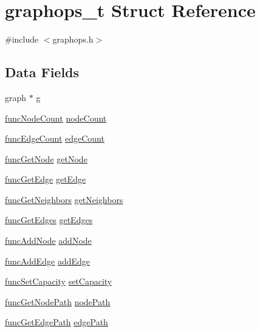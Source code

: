 \hypertarget{structgraphops__t}{}\section{graphops\+\_\+t Struct Reference}
\label{structgraphops__t}


{\ttfamily \#include $<$graphops.\+h$>$}

\subsection*{Data Fields}
\begin{DoxyCompactItemize}
\item 
graph $\ast$ \hyperlink{structgraphops__t_ab8a78cf4f0bdfe6a65aa217a716ca537}{g}
\item 
\hyperlink{graphops_8h_a5f1ba03cba8efec39224db7b6afc8374}{func\+Node\+Count} \hyperlink{structgraphops__t_a07801b43de87d48f426d7abf7959e738}{node\+Count}
\item 
\hyperlink{graphops_8h_a9c7f99c0f38ebae08cb49e70ffe91fa1}{func\+Edge\+Count} \hyperlink{structgraphops__t_a5db6e2eee59ada7705fb54bf5f6b9ee1}{edge\+Count}
\item 
\hyperlink{graphops_8h_ab5b794bee2b91f62033011c8e4c867ec}{func\+Get\+Node} \hyperlink{structgraphops__t_ab410442ef123fc79f1c8a431502e2a23}{get\+Node}
\item 
\hyperlink{graphops_8h_aed109d4861cfae4ea7721603770befca}{func\+Get\+Edge} \hyperlink{structgraphops__t_aafbe3ec7bdce040b86d7748c953cf607}{get\+Edge}
\item 
\hyperlink{graphops_8h_a201169542b84db39bcb68ae94223e773}{func\+Get\+Neighbors} \hyperlink{structgraphops__t_ac6c5bec2f102e4da5959cc3db66ac3c6}{get\+Neighbors}
\item 
\hyperlink{graphops_8h_af1e618623a0855f489ac957e5ae24ac0}{func\+Get\+Edges} \hyperlink{structgraphops__t_a87fec7e1150c05e54e34ab09fe401eaa}{get\+Edges}
\item 
\hyperlink{graphops_8h_ac3a2b8cb9dcf1f1a8cd4cb5f819e245a}{func\+Add\+Node} \hyperlink{structgraphops__t_aa1fdab76a86ab2889415964b51f1738f}{add\+Node}
\item 
\hyperlink{graphops_8h_a7db3802ca9110f9f9095250ed85a39a5}{func\+Add\+Edge} \hyperlink{structgraphops__t_af9a74b6643b49f7799dfa78f4824aa22}{add\+Edge}
\item 
\hyperlink{graphops_8h_a7f161b975929757de2684535b39d60bb}{func\+Set\+Capacity} \hyperlink{structgraphops__t_a6f05f8daf75bc380988e20e019681c0a}{set\+Capacity}
\item 
\hyperlink{graphops_8h_a43aa084c4514d1f3c2179551905aa655}{func\+Get\+Node\+Path} \hyperlink{structgraphops__t_afd2a0b194e922fa656b4352a8fed9e05}{node\+Path}
\item 
\hyperlink{graphops_8h_ac2b0381c5a4018e52104e27c57fb5c2c}{func\+Get\+Edge\+Path} \hyperlink{structgraphops__t_ab0fdace070db2a1fa199e920b6136a04}{edge\+Path}
\end{DoxyCompactItemize}


